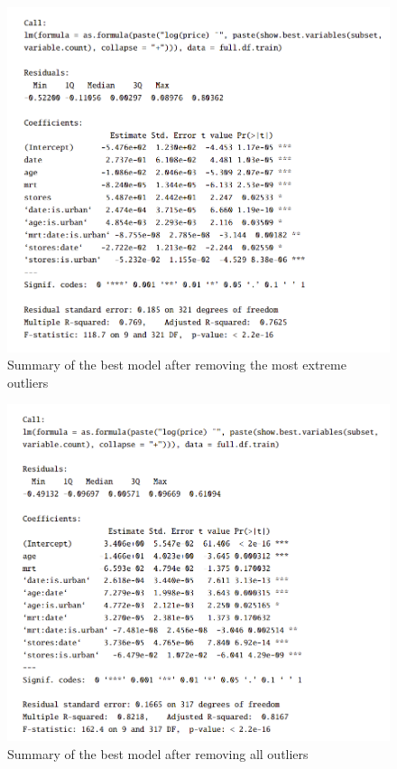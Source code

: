 \begin{figure}[hbt!]
    \centering
    \includegraphics[scale=0.65]{img/n=413.png}
    \caption{Summary of the best model after removing the most extreme outliers}
    \label{fig:n=413}
\end{figure}

\begin{figure}[hbt!]
    \centering
    \includegraphics[scale=0.65]{img/n=408.png}
    \caption{Summary of the best model after removing all outliers}
    \label{fig:n=408}
\end{figure}

\clearpage 